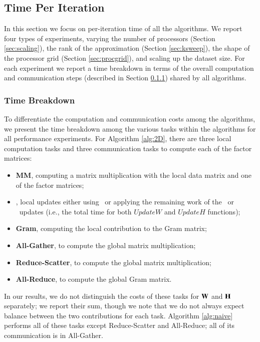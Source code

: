 \subsection{Time Per Iteration}

In this section we focus on per-iteration time of all the algorithms.
We report four types of experiments, varying the number of processors (Section \ref{sec:scaling}), the rank of the approximation (Section \ref{sec:ksweep}), the shape of the processor grid (Section \ref{sec:procgrid}), and scaling up the dataset size.
For each experiment we report a time breakdown in terms of the overall computation and communication steps (described in Section \ref{sec:perf-breakdown}) shared by all algorithms.

\subsubsection{Time Breakdown}
\label{sec:perf-breakdown}

To differentiate the computation and communication costs among the algorithms, we present the time breakdown among the various tasks within the algorithms for all performance experiments.
For Algorithm \ref{alg:2D}, there are three local computation tasks and three communication tasks to compute each of the factor matrices:
\begin{itemize}
	\item \textbf{MM}, computing a matrix multiplication with the local data matrix and one of the factor matrices;
	\item \textbf{\LUC}, local updates either using \BPP\ or applying the remaining work of the \MU\ or \HALS\ updates (i.e., the total time for both $UpdateW$ and $UpdateH$ functions); 
	\item \textbf{Gram}, computing the local contribution to the Gram matrix;
	\item \textbf{All-Gather}, to compute the global matrix multiplication;
	\item \textbf{Reduce-Scatter}, to compute the global matrix multiplication;
	\item \textbf{All-Reduce}, to compute the global Gram matrix.
\end{itemize}
In our results, we do not distinguish the costs of these tasks for $\mathbf{W}$ and $\mathbf{H}$ separately; we report their sum, though we note that we do not always expect balance between the two contributions for each task.
Algorithm \ref{alg:naive} performs all of these tasks except Reduce-Scatter and All-Reduce; all of its communication is in All-Gather.

